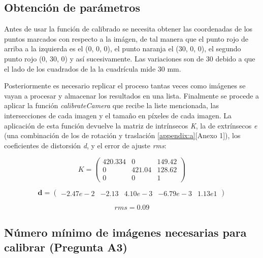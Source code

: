 \documentclass[a4paper,12pt]{article}
\begin{document}
{\begin{figure}[h!]
\end{figure}

\vspace{0.5cm}

\subsection{Obtención de parámetros}

\vspace{0.5cm}

Antes de usar la función de calibrado se necesita obtener las coordenadas de los puntos marcados con respecto a la imágen, de tal manera que el punto rojo de arriba a la izquierda es el (0, 0, 0), el punto naranja el (30, 0, 0), el segundo punto rojo (0, 30, 0) y así sucesivamente. Las variaciones son de 30 debido a que el lado de los cuadrados de la la cuadrícula mide 30 mm.

\vspace{0.5cm}

Posteriormente es necesario replicar el proceso tantas veces como imágenes se vayan a procesar y almacenar los resultados en una lista. Finalmente se procede a aplicar la función \textit{calibrateCamera} que recibe la liste mencionada, las intersecciones de cada imagen y el tamaño en píxeles de cada imagen. La aplicación de esta función devuelve la matriz de intrínsecos \textit{K}, la de extrínsecos \textit{e} (una combinación de los de rotación y traslación \ref{appendix:a}[Anexo 1]), los coeficientes de distorsión \textit{d}, y el error de ajuste \textit{rms}:

\vspace{0.5cm}

\[
K = \begin{pmatrix}
420.334 & 0 & 149.42 \\
0 & 421.04 & 128.62 \\
0 & 0 & 1
\end{pmatrix}
\]

\[
\mathbf{d} = \begin{pmatrix}
-2.47e-2 & -2.13 & 4.10e-3 & -6.79e-3 & 1.13e1
\end{pmatrix}
\]

$$rms=0.09$$

\vspace{0.5cm}

\subsection{Número mínimo de imágenes necesarias para calibrar (Pregunta A3)}

}
\end{document}
